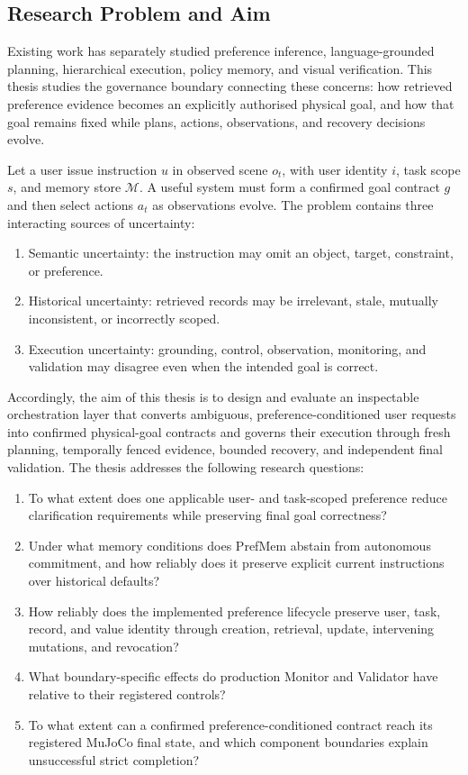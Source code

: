 \documentclass{article}
\begin{document}
\subsection{Research Problem and Aim}
\label{subsec:research-problem}
Existing work has separately studied preference inference, language-grounded
planning, hierarchical execution, policy memory, and visual verification.
This thesis studies the governance boundary connecting these concerns: how
retrieved preference evidence becomes an explicitly authorised physical goal,
and how that goal remains fixed while plans, actions, observations, and
recovery decisions evolve.

Let a user issue instruction \(u\) in observed scene \(o_t\), with user
identity \(i\), task scope \(s\), and memory store \(\mathcal{M}\). A useful
system must form a confirmed goal contract \(g\) and then select actions
\(a_t\) as observations evolve. The problem contains three interacting
sources of uncertainty:
\begin{enumerate}
    \item Semantic uncertainty: the instruction may omit an object, target, constraint, or preference.
    \item Historical uncertainty: retrieved records may be irrelevant, stale, mutually inconsistent, or incorrectly scoped.
    \item Execution uncertainty: grounding, control, observation, monitoring, and validation may disagree even when the intended goal is correct.
\end{enumerate}

Accordingly, the aim of this thesis is to design and evaluate an inspectable
orchestration layer that converts ambiguous, preference-conditioned user
requests into confirmed physical-goal contracts and governs their execution
through fresh planning, temporally fenced evidence, bounded recovery, and
independent final validation. The thesis addresses the following research
questions:
\begin{enumerate}
    \item To what extent does one applicable user- and task-scoped preference reduce clarification requirements while preserving final goal correctness?
    \item Under what memory conditions does PrefMem abstain from autonomous commitment, and how reliably does it preserve explicit current instructions over historical defaults?
    \item How reliably does the implemented preference lifecycle preserve user, task, record, and value identity through creation, retrieval, update, intervening mutations, and revocation?
    \item What boundary-specific effects do production Monitor and Validator have relative to their registered controls?
    \item To what extent can a confirmed preference-conditioned contract reach its registered MuJoCo final state, and which component boundaries explain unsuccessful strict completion?
\end{enumerate}
\end{document}
